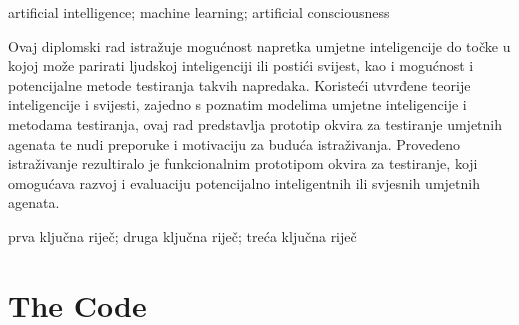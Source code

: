 \documentclass[masterthesis]{fer}
\begin{document}
\begin{keywords}
  artificial intelligence; machine learning; artificial consciousness
\end{keywords}


\begin{sazetak}
  Ovaj diplomski rad istražuje mogućnost napretka umjetne inteligencije do točke u kojoj može parirati ljudskoj inteligenciji ili postići svijest, kao i mogućnost i potencijalne metode testiranja takvih napredaka. Koristeći utvrđene teorije inteligencije i svijesti, zajedno s poznatim modelima umjetne inteligencije i metodama testiranja, ovaj rad predstavlja prototip okvira za testiranje umjetnih agenata te nudi preporuke i motivaciju za buduća istraživanja. Provedeno istraživanje rezultiralo je funkcionalnim prototipom okvira za testiranje, koji omogućava razvoj i evaluaciju potencijalno inteligentnih ili svjesnih umjetnih agenata.
\end{sazetak}

\begin{kljucnerijeci}
  prva ključna riječ; druga ključna riječ; treća ključna riječ
\end{kljucnerijeci}




\backmatter

\chapter{The Code}

\Blindtext
\end{document}
